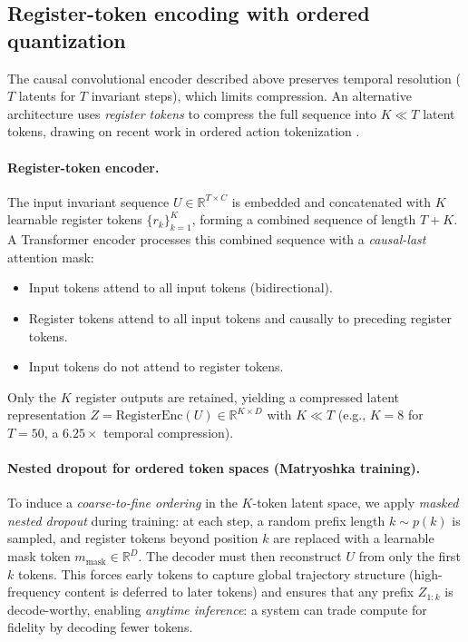 \documentclass[11pt]{article}
\begin{document}
\subsection{Register-token encoding with ordered quantization}
The causal convolutional encoder described above preserves temporal resolution ($T$ latents for $T$ invariant steps), which limits compression. An alternative architecture uses \emph{register tokens} to compress the full sequence into $K \ll T$ latent tokens, drawing on recent work in ordered action tokenization \cite{liu2026oat}.

\paragraph{Register-token encoder.}
The input invariant sequence $U \in \mathbb{R}^{T\times C}$ is embedded and concatenated with $K$ learnable register tokens $\{r_k\}_{k=1}^{K}$, forming a combined sequence of length $T+K$. A Transformer encoder processes this combined sequence with a \emph{causal-last} attention mask:
\begin{itemize}
  \item Input tokens attend to all input tokens (bidirectional).
  \item Register tokens attend to all input tokens and causally to preceding register tokens.
  \item Input tokens do not attend to register tokens.
\end{itemize}
Only the $K$ register outputs are retained, yielding a compressed latent representation $Z = \mathrm{RegisterEnc}(U) \in \mathbb{R}^{K\times D}$ with $K \ll T$ (e.g., $K=8$ for $T=50$, a $6.25\times$ temporal compression).

\paragraph{Nested dropout for ordered token spaces (Matryoshka training).}
To induce a \emph{coarse-to-fine ordering} in the $K$-token latent space, we apply \emph{masked nested dropout} during training: at each step, a random prefix length $k\sim p(k)$ is sampled, and register tokens beyond position $k$ are replaced with a learnable mask token $m_{\mathrm{mask}} \in \mathbb{R}^{D}$. The decoder must then reconstruct $U$ from only the first $k$ tokens. This forces early tokens to capture global trajectory structure (high-frequency content is deferred to later tokens) and ensures that any prefix $Z_{1:k}$ is decode-worthy, enabling \emph{anytime inference}: a system can trade compute for fidelity by decoding fewer tokens.
\end{document}
